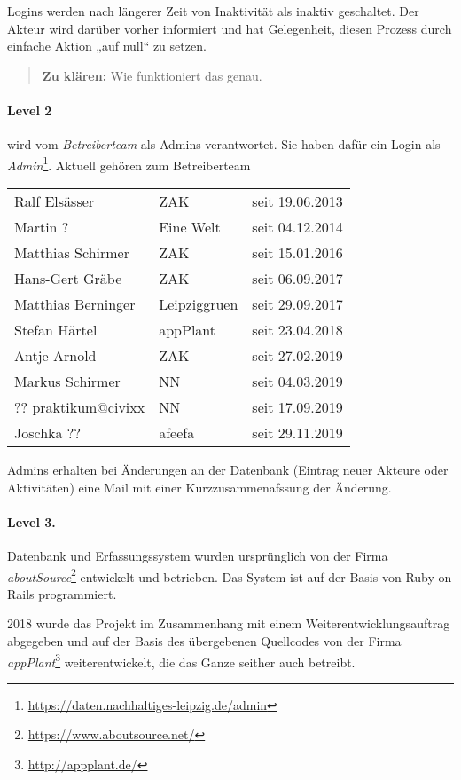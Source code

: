 \documentclass[a4paper,11pt]{article}
\newcommand{\zuklaeren}[1]{\begin{quote} \textbf{Zu klären:} #1 \end{quote}}
\begin{document}
Logins werden nach längerer Zeit von Inaktivität als inaktiv geschaltet.  Der
Akteur wird darüber vorher informiert und hat Gelegenheit, diesen Prozess
durch einfache Aktion „auf null“ zu setzen.

\zuklaeren{Wie funktioniert das genau.}

\paragraph{Level 2}
wird vom \emph{Betreiberteam} als Admins verantwortet. Sie haben dafür ein
Login als
\emph{Admin}\footnote{\url{https://daten.nachhaltiges-leipzig.de/admin}}.
Aktuell gehören zum Betreiberteam
\begin{center}
  \begin{tabular}{llc}
    Ralf Elsässer & ZAK & seit 19.06.2013\\
    Martin ? & Eine Welt & seit 04.12.2014\\
    Matthias Schirmer & ZAK & seit 15.01.2016\\
    Hans-Gert Gräbe & ZAK & seit 06.09.2017\\
    Matthias Berninger & Leipziggruen & seit 29.09.2017\\
    Stefan Härtel & appPlant & seit 23.04.2018\\
    Antje Arnold & ZAK & seit 27.02.2019\\
    Markus Schirmer & NN & seit 04.03.2019\\
    ?? praktikum@civixx & NN & seit 17.09.2019\\
    Joschka ?? & afeefa & seit 29.11.2019
  \end{tabular}
\end{center}
Admins erhalten bei Änderungen an der Datenbank (Eintrag neuer Akteure oder
Aktivitäten) eine Mail mit einer Kurzzusammenafssung der Änderung.

\paragraph{Level 3.}
Datenbank und Erfassungssystem wurden ursprünglich von der Firma
\emph{aboutSource}\footnote{\url{https://www.aboutsource.net/}} entwickelt und
betrieben.  Das System ist auf der Basis von Ruby on Rails programmiert. 

2018 wurde das Projekt im Zusammenhang mit einem Weiterentwicklungsauftrag
abgegeben und auf der Basis des übergebenen Quellcodes von der Firma
\emph{appPlant}\footnote{\url{http://appplant.de/}} weiterentwickelt, die das
Ganze seither auch betreibt.
\end{document}
